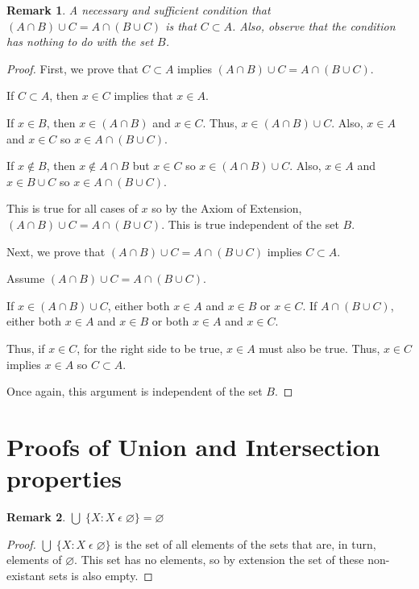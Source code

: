 \documentclass[12pt]{article}
\newtheorem{remark}{Remark}
\begin{document}
\begin{remark}
    A necessary and sufficient condition that $(A \cap B) \cup C = A \cap (B \cup C)$ is that $C \subset A$.
    Also, observe that the condition has nothing to do with the set $B$.
\end{remark}
\begin{proof}
    First, we prove that $C \subset A$ implies $(A \cap B) \cup C = A \cap (B \cup C)$.

    If $C \subset A$, then $x \in C$ implies that $x \in A$.

    If $x \in B$, then $x \in (A \cap B)$ and $x \in C$. Thus, $x \in (A \cap B) \cup C$.
    Also, $x \in A$ and $x \in C$ so $x \in A \cap (B \cup C)$.

    If $x \notin B$, then $x \notin A \cap B$ but $x \in C$ so $x \in (A \cap B) \cup C$.
    Also, $x \in A$ and $x \in B \cup C$ so $x \in A \cap(B \cup C)$.

    This is true for all cases of $x$ so by the Axiom of Extension, $(A \cap B) \cup C = A \cap (B \cup C)$.
    This is true independent of the set $B$.

    Next, we prove that $(A \cap B) \cup C = A \cap (B \cup C)$ implies $C \subset A$.

    Assume $(A \cap B) \cup C = A \cap (B \cup C)$.

    If $x \in (A \cap B) \cup C$, either both $x \in A$ and $x \in B$ or $x \in C$.
    If $A \cap (B \cup C)$, either both $x \in A$ and $x \in B$ or both $x \in A$ and $x \in C$.

    Thus, if $x \in C$, for the right side to be true, $x \in A$ must also be true. Thus, $x \in C$ implies $x \in A$
    so $C \subset A$.

    Once again, this argument is independent of the set $B$.
\end{proof}






\appendix
\section{Proofs of Union and Intersection properties}\label{Appendix: Unions and Intersections proofs}
\begin{remark}
    $\bigcup\;\{X: X\;\epsilon\;\varnothing\} = \varnothing$
\end{remark}
\begin{proof}
    $\bigcup\;\{X: X\;\epsilon\;\varnothing\}$ is the set of all elements of the sets that are, in turn,
    elements of $\varnothing$. This set has no elements, so by extension the set of these non-existant
    sets is also empty.
\end{proof}
\end{document}
